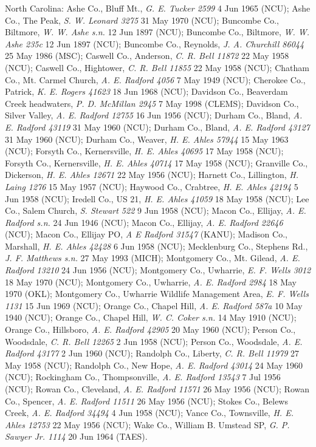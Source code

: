\documentclass{article}
\begin{document}
North Carolina:
Ashe Co., Bluff Mt., \textit{G. E. Tucker 2599} 4 Jun 1965 (NCU);
Ashe Co., The Peak, \textit{S. W. Leonard 3275} 31 May 1970 (NCU);
Buncombe Co., Biltmore, \textit{W. W. Ashe s.n.} 12 Jun 1897 (NCU);
Buncombe Co., Biltmore, \textit{W. W. Ashe 235c} 12 Jun 1897 (NCU);
Buncombe Co., Reynolds, \textit{J. A. Churchill 86044} 25 May 1986 (MSC);
Caswell Co., Anderson, \textit{C. R. Bell 11872} 22 May 1958 (NCU);
Caswell Co., Hightower, \textit{C. R. Bell 11855} 22 May 1958 (NCU);
Chatham Co.,  Mt. Carmel Church, \textit{A. E. Radford 4056} 7 May 1949 (NCU);
Cherokee Co., Patrick, \textit{K. E. Rogers 41623} 18 Jun 1968 (NCU);
Davidson Co., Beaverdam Creek headwaters, \textit{P. D. McMillan 2945} 7 May 1998 (CLEMS);
Davidson Co., Silver Valley, \textit{A. E. Radford 12755} 16 Jun 1956 (NCU);
Durham Co., Bland, \textit{A. E. Radford 43119} 31 May 1960 (NCU);
Durham Co., Bland, \textit{A. E. Radford 43127} 31 May 1960 (NCU);
Durham Co., Weaver, \textit{H. E. Ahles 57944} 15 May 1963 (NCU);
Forsyth Co., Kernersville, \textit{H. E. Ahles 40695} 17 May 1958 (NCU);
Forsyth Co., Kernersville, \textit{H. E. Ahles 40714} 17 May 1958 (NCU);
Granville Co., Dickerson, \textit{H. E. Ahles 12671} 22 May 1956 (NCU);
Harnett Co., Lillington, \textit{H. Laing 1276} 15 May 1957 (NCU);
Haywood Co., Crabtree, \textit{H. E. Ahles 42194} 5 Jun 1958 (NCU);
Iredell Co., US 21, \textit{H. E. Ahles 41059} 18 May 1958 (NCU);
Lee Co., Salem Church, \textit{S. Stewart 522} 9 Jun 1958 (NCU);
Macon Co., Ellijay, \textit{A. E. Radford s.n.} 24 Jun 1946 (NCU);
Macon Co., Ellijay, \textit{A. E. Radford 22646}  (NCU);
Macon Co., Ellijay PO, \textit{A E Radford 31547}  (KANU);
Madison Co., Marshall, \textit{H. E. Ahles 42428} 6 Jun 1958 (NCU);
Mecklenburg Co., Stephens Rd., \textit{J. F. Matthews s.n.} 27 May 1993 (MICH);
Montgomery Co., Mt. Gilead, \textit{A. E. Radford 13210} 24 Jun 1956 (NCU);
Montgomery Co., Uwharrie, \textit{E. F. Wells 3012} 18 May 1970 (NCU);
Montgomery Co., Uwharrie, \textit{A. E. Radford 2984} 18 May 1970 (OKL);
Montgomery Co., Uwharrie Wildlife Management Area, \textit{E. F. Wells 1131} 15 Jun 1969 (NCU);
Orange Co., Chapel Hill, \textit{A. E. Radford 587a} 10 May 1940 (NCU);
Orange Co., Chapel Hill, \textit{W. C. Coker s.n.} 14 May 1910 (NCU);
Orange Co., Hillsboro, \textit{A. E. Radford 42905} 20 May 1960 (NCU);
Person Co., Woodsdale, \textit{C. R. Bell 12265} 2 Jun 1958 (NCU);
Person Co., Woodsdale, \textit{A. E. Radford 43177} 2 Jun 1960 (NCU);
Randolph Co., Liberty, \textit{C. R. Bell 11979} 27 May 1958 (NCU);
Randolph Co., New Hope, \textit{A. E. Radford 43014} 24 May 1960 (NCU);
Rockingham Co., Thompsonville, \textit{A. E. Radford 13543} 7 Jul 1956 (NCU);
Rowan Co., Cleveland, \textit{A. E. Radford 11571} 26 May 1956 (NCU);
Rowan Co., Spencer, \textit{A. E. Radford 11511} 26 May 1956 (NCU);
Stokes Co., Belews Creek, \textit{A. E. Radford 34494} 4 Jun 1958 (NCU);
Vance Co., Townsville, \textit{H. E. Ahles 12753} 22 May 1956 (NCU);
Wake Co., William B. Umstead SP, \textit{G. P. Sawyer Jr. 1114} 20 Jun 1964 (TAES).
\end{document}
